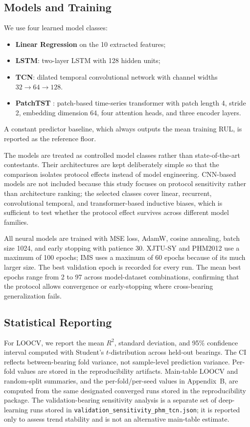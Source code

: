 \documentclass[pdflatex,sn-mathphys-num]{sn-jnl}
\begin{document}
\subsection{Models and Training}
We use four learned model classes:
\begin{itemize}
    \item \textbf{Linear Regression} on the 10 extracted features;
    \item \textbf{LSTM}: two-layer LSTM with 128 hidden units;
    \item \textbf{TCN}: dilated temporal convolutional network with channel widths $32 \to 64 \to 128$.
    \item \textbf{PatchTST} \cite{patchtst2023}: patch-based time-series transformer with patch length 4, stride 2, embedding dimension 64, four attention heads, and three encoder layers. \cite{vaswani2017attention}
\end{itemize}
A constant predictor baseline, which always outputs the mean training RUL, is reported as the reference floor.

The models are treated as controlled model classes rather than state-of-the-art contestants. Their architectures are kept deliberately simple so that the comparison isolates protocol effects instead of model engineering. CNN-based models are not included because this study focuses on protocol sensitivity rather than architecture ranking; the selected classes cover linear, recurrent, convolutional temporal, and transformer-based inductive biases, which is sufficient to test whether the protocol effect survives across different model families.

All neural models are trained with MSE loss, AdamW, cosine annealing, batch size 1024, and early stopping with patience 30. XJTU-SY and PHM2012 use a maximum of 100 epochs; IMS uses a maximum of 60 epochs because of its much larger size. The best validation epoch is recorded for every run. The mean best epochs range from 2 to 97 across model-dataset combinations, confirming that the protocol allows convergence or early-stopping where cross-bearing generalization fails.

\subsection{Statistical Reporting}
For LOOCV, we report the mean $R^2$, standard deviation, and 95\% confidence interval computed with Student's $t$-distribution across held-out bearings. The CI reflects between-bearing fold variance, not sample-level prediction variance. Per-fold values are stored in the reproducibility artifacts. Main-table LOOCV and random-split summaries, and the per-fold/per-seed values in Appendix~B, are computed from the same designated converged runs stored in the reproducibility package. The validation-bearing sensitivity analysis is a separate set of deep-learning runs stored in \texttt{validation\_sensitivity\_phm\_tcn.json}; it is reported only to assess trend stability and is not an alternative main-table estimate.
\end{document}
